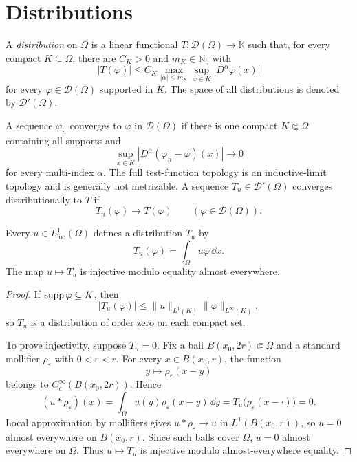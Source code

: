 \section{Distributions}

\begin{notedefinition}
A \emph{distribution} on $\Omega$ is a linear functional
$T\colon\mathcal D(\Omega)\to\mathbb K$ such that, for every compact
$K\subseteq\Omega$, there are $C_K>0$ and $m_K\in\mathbb N_0$ with
\[
  |T(\varphi)|
  \le C_K
      \max_{|\alpha|\le m_K}
      \sup_{x\in K}|D^\alpha\varphi(x)|
\]
for every $\varphi\in\mathcal D(\Omega)$ supported in $K$.  The space of all
distributions is denoted by $\mathcal D'(\Omega)$.
\end{notedefinition}

\begin{noteremark}[Topology]
A sequence $\varphi_n$ converges to $\varphi$ in $\mathcal D(\Omega)$ if there
is one compact $K\Subset\Omega$ containing all supports and
\[
  \sup_{x\in K}|D^\alpha(\varphi_n-\varphi)(x)|\longrightarrow0
\]
for every multi-index $\alpha$.  The full test-function topology is an
inductive-limit topology and is generally not metrizable.  A sequence
$T_n\in\mathcal D'(\Omega)$ converges distributionally to $T$ if
\[
  T_n(\varphi)\longrightarrow T(\varphi)
  \qquad(\varphi\in\mathcal D(\Omega)).
\]
\end{noteremark}

\begin{noteproposition}
Every $u\in L^1_{\mathrm{loc}}(\Omega)$ defines a distribution
$T_u$ by
\[
  T_u(\varphi)=\int_\Omega u\varphi\,\dd x.
\]
The map $u\mapsto T_u$ is injective modulo equality almost everywhere.
\end{noteproposition}

\begin{proof}
If $\operatorname{supp}\varphi\subseteq K$, then
\[
  |T_u(\varphi)|
  \le\|u\|_{L^1(K)}\|\varphi\|_{L^\infty(K)},
\]
so $T_u$ is a distribution of order zero on each compact set.

To prove injectivity, suppose $T_u=0$.  Fix a ball
$B(x_0,2r)\Subset\Omega$ and a standard mollifier $\rho_\varepsilon$ with
$0<\varepsilon<r$.  For every $x\in B(x_0,r)$, the function
\[
  y\longmapsto\rho_\varepsilon(x-y)
\]
belongs to $C_c^\infty(B(x_0,2r))$.  Hence
\[
  (u*\rho_\varepsilon)(x)
  =\int_\Omega u(y)\rho_\varepsilon(x-y)\,\dd y
  =T_u\bigl(\rho_\varepsilon(x-\cdot)\bigr)
  =0.
\]
Local approximation by mollifiers gives
$u*\rho_\varepsilon\to u$ in $L^1(B(x_0,r))$, so $u=0$ almost everywhere on
$B(x_0,r)$.  Since such balls cover $\Omega$, $u=0$ almost everywhere on
$\Omega$.  Thus $u\mapsto T_u$ is injective modulo almost-everywhere equality.
\end{proof}

